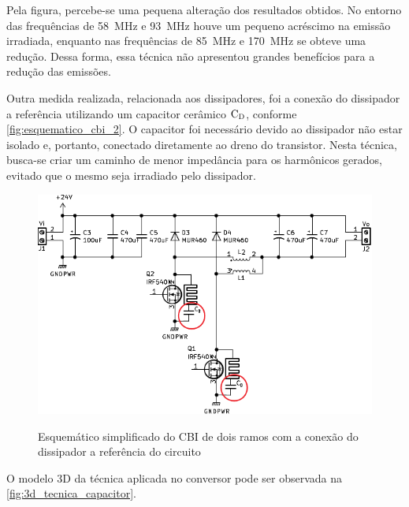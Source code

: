     Pela figura, percebe-se uma pequena alteração dos resultados obtidos. No entorno das frequências de \SI{58}{\mega\hertz} e \SI{93}{\mega\hertz} houve um pequeno acréscimo na emissão irradiada, enquanto nas frequências de \SI{85}{\mega\hertz} e \SI{170}{\mega\hertz} se obteve uma redução. Dessa forma, essa técnica não apresentou grandes benefícios para a redução das emissões. 
    
    Outra medida realizada, relacionada aos dissipadores, foi a conexão do dissipador a referência utilizando um capacitor cerâmico $\text{C}_\text{D}$, conforme \autoref{fig:esquematico_cbi_2}. O capacitor foi necessário devido ao dissipador não estar isolado e, portanto, conectado diretamente ao dreno do transistor. Nesta técnica, busca-se criar um caminho de menor impedância para os harmônicos gerados, evitado que o mesmo seja irradiado pelo dissipador. 
    
    \begin{figure}[H]
    	\centering
    	\caption{Esquemático simplificado do CBI de dois ramos com a conexão do dissipador a referência do circuito}
    	\includegraphics[scale=1.2]{pdf/layout/Esquematico_CBI_dissipador2.pdf}
        \label{fig:esquematico_cbi_2}
    \end{figure}
    
    
    O modelo 3D da técnica aplicada no conversor pode ser observada na \autoref{fig:3d_tecnica_capacitor}.
    
